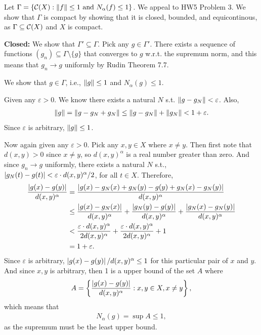 \documentclass[12pt]{article}
\begin{document}
\begin{fproof}[1(a)]
Let \(\Gamma = \left\{ \mathcal{C}(X):\left\lVert f \right\rVert\leq 1 \text{ and } N_{\alpha}(f) \leq 1 \right\}\).
We appeal to HW5 Problem 3.
We show that \(\Gamma\) is compact by showing that it is closed, bounded, and equicontinous, as \(\Gamma \subseteq \mathcal{C}(X)\) and \(X\) is compact.

\textbf{Closed:}
We show that \(\Gamma' \subseteq \Gamma\).
Pick any \(g \in \Gamma'\).
There exists a sequence of functions \((g_n) \subseteq \Gamma \setminus \{g\}\) that converges to \(g\) w.r.t. the supremum norm, and this means that \(g_n \to g\) uniformly by Rudin Theorem 7.7.

We show that \(g \in \Gamma\), i.e., \(\left\lVert g \right\rVert \leq 1\) and \(N_{\alpha}(g) \leq 1\).

Given any \(\varepsilon > 0\).
We know there exists a natural \(N\) s.t. \(\left\lVert g - g_N \right\rVert < \varepsilon\).
Also,
\begin{align*}
    \left\lVert g \right\rVert = \left\lVert g - g_N + g_N \right\rVert \leq \left\lVert g-g_N \right\rVert + \left\lVert g_N \right\rVert < 1 + \varepsilon.
\end{align*}
Since \(\varepsilon\) is arbitrary, \(\left\lVert g \right\rVert \leq 1\).

Now again given any \(\varepsilon > 0\).
Pick any \(x,y \in X\) where \(x \neq y\).
Then first note that \(d(x,y)>0\) since \(x\neq y\), so \(d(x,y)^{\alpha}\) is a real number greater than zero.
And since \(g_n \to g\) uniformly, there exists a natural \(N\) s.t., \(\left\lvert g_N(t)-g(t) \right\rvert < \varepsilon \cdot d(x,y)^{\alpha}/2\), for all \(t \in X\).
Therefore,
\begin{align*}
    \frac{\left\lvert g(x)-g(y) \right\rvert}{d(x,y)^{\alpha}} &= \frac{\left\lvert g(x)-g_N(x) + g_N(y) -g(y) + g_N(x)-g_N(y) \right\rvert}{d(x,y)^{\alpha}}\\
    & \leq \frac{\left\lvert g(x)-g_N(x) \right\rvert}{d(x,y)^{\alpha}} + \frac{\left\lvert g_N(y)-g(y) \right\rvert}{d(x,y)^{\alpha}} + \frac{\left\lvert g_N(x)-g_N(y) \right\rvert}{d(x,y)^{\alpha}}\\
    &<\frac{\varepsilon \cdot d(x,y)^{\alpha}}{2 d(x,y)^{\alpha}} + \frac{\varepsilon \cdot d(x,y)^{\alpha}}{2 d(x,y)^{\alpha}} + 1\\
    &= 1 + \varepsilon.
\end{align*}
Since \(\varepsilon\) is arbitrary, \(\left\lvert g(x)-g(y) \right\rvert/d(x,y)^{\alpha} \leq 1\) for this particular pair of \(x\) and \(y\).
And since \(x,y\) is arbitrary,
then 1 is a upper bound of the set \(A\) where 
\begin{align*}
    A = \left\{ \frac{\left\lvert g(x)-g(y) \right\rvert}{d(x,y)^{\alpha}} : x,y \in X, x\neq y \right\},
\end{align*}
which means that
\begin{align*}
    N_{\alpha}(g) = \sup A \leq 1,
\end{align*}
as the supremum must be the least upper bound.


\end{fproof}
\end{document}
